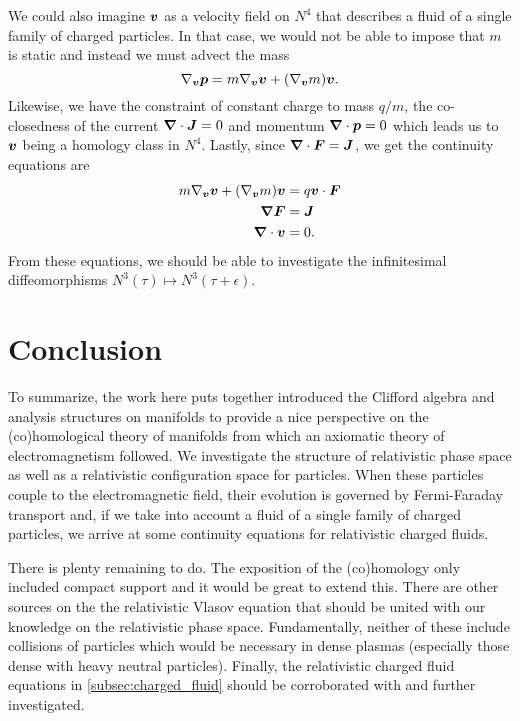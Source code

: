 \documentclass[conf]{new-aiaa}
\begin{document}
We could also imagine ${\boldsymbol{v}}$ as a velocity field on $N^4$ that describes a fluid of a single family of charged particles. In that case, we would not be able to impose that $m$ is static and instead we must advect the mass
\begin{equation}
   \nabla_{\boldsymbol{v}} \boldsymbol{p} = m \nabla_{\boldsymbol{v}} \boldsymbol{v} + (\nabla_{\boldsymbol{v}} m)\boldsymbol{v}.
\end{equation}
Likewise, we have the constraint of constant charge to mass $q/m$, the co-closedness of the current $\boldsymbol{\nabla} \cdot \boldsymbol{J}=0$ and momentum $\boldsymbol{\nabla} \cdot \boldsymbol{p}=0$ which leads us to $\boldsymbol{v}$ being a homology class in $N^4$. Lastly, since $\boldsymbol{\nabla} \cdot \boldsymbol{F} = \boldsymbol{J}$, we get the continuity equations are
\begin{align}
    m \nabla_{\boldsymbol{v}} \boldsymbol{v} + (\nabla_{\boldsymbol{v}} m)\boldsymbol{v} &= q \boldsymbol{v} \cdot \boldsymbol{F}\\
    \boldsymbol{\nabla} \boldsymbol{F} &= \boldsymbol{J}\\
    \boldsymbol{\nabla} \cdot \boldsymbol{v} &= 0.
\end{align}
From these equations, we should be able to investigate the infinitesimal diffeomorphisms $N^3(\tau)\mapsto N^3(\tau+\epsilon)$.

\section{Conclusion}

To summarize, the work here puts together introduced the Clifford algebra and analysis structures on manifolds to provide a nice perspective on the (co)homological theory of manifolds from which an axiomatic theory of electromagnetism followed. We investigate the structure of relativistic phase space as well as a relativistic configuration space for particles. When these particles couple to the electromagnetic field, their evolution is governed by Fermi-Faraday transport and, if we take into account a fluid of a single family of charged particles, we arrive at some continuity equations for relativistic charged fluids.

There is plenty remaining to do. The exposition of the (co)homology only included compact support and it would be great to extend this. There are other sources on the the relativistic Vlasov equation \cite{brizard_new_2000,marsden_hamiltonian_1982} that should be united with our knowledge on the relativistic phase space. Fundamentally, neither of these include collisions of particles which would be necessary in dense plasmas (especially those dense with heavy neutral particles). Finally, the relativistic charged fluid equations in \cref{subsec:charged_fluid} should be corroborated with \cite{pausader_relativistic_2013} and further investigated.
\end{document}
